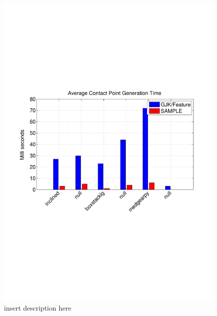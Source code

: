 \begin{figure}
  \centering
  \includegraphics[width=0.5\columnwidth]{collisiontimetest1.pdf}
  \caption{ insert description here }
  \label{fig:collisiontimetest1}
\end{figure}


